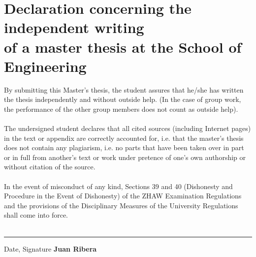 \chapter*{\LARGE Declaration concerning the independent writing \\
of a master thesis at the School of Engineering}
By submitting this Master's thesis, the student assures that he/she has written the thesis independently and without outside help. (In the case of group work, the performance of the other group members does not count as outside help). \\ \\
The undersigned student declares that all cited sources (including Internet pages) in the text or appendix are correctly accounted for, i.e. that the master's thesis does not contain any plagiarism, i.e. no parts that have been taken over in part or in full from another's text or work under pretence of one's own authorship or without citation of the source. \\ \\
In the event of misconduct of any kind, Sections 39 and 40 (Dishonesty and Procedure in the Event of Dishonesty) of the ZHAW Examination Regulations and the provisions of the Disciplinary Measures of the University Regulations shall come into force. \\
\vspace{50pt} \\
\begin{flushright}
	\noindent \rule{7.0cm}{0.4pt} \par
	\scriptsize{Date, Signature} \hspace{3cm} \textbf{\scriptsize{Juan Ribera}}
\end{flushright}
